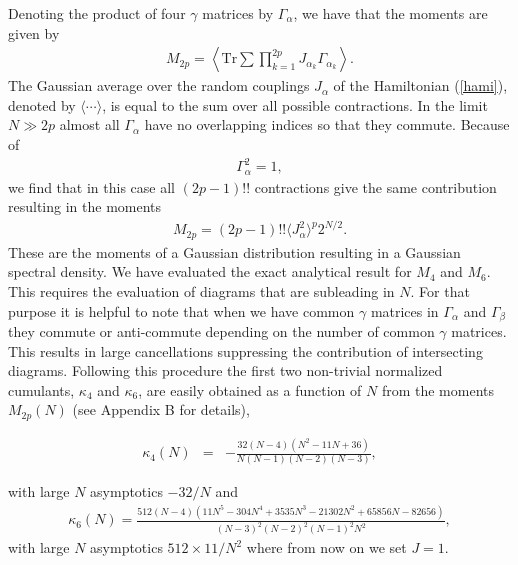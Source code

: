 \documentclass[aps,showpacs,floatfix,superscriptaddress,pre,11pt]{revtex4-1}
\newcommand{\Tr}{\rm Tr}
\newcommand{\be}{\begin{eqnarray}}
\newcommand{\ee}{\end{eqnarray}}
\def\Tr{\textrm{Tr}}
\begin{document}
 Denoting the product of four $\gamma$ matrices by $\Gamma_\alpha$, we have
 that
the moments are given by
 \be
 M_{2p} = \left \langle \Tr \sum \prod_{k=1}^{2p} J_{\alpha_k} \Gamma_{\alpha_k}
 \right \rangle.
\ee
 The Gaussian average over the random couplings $J_\alpha$ of the Hamiltonian (\ref{hami}), denoted by $\langle \cdots \rangle$,  is equal to the sum over all possible
contractions.
In the limit $N \gg 2p$ almost all  $\Gamma_\alpha$ have no
overlapping indices so that they commute. Because of
\be
\Gamma_\alpha^2 =1,
\label{gam2}
\ee
 we find that in this case all $(2p-1)!!$ contractions
give the same contribution resulting in the moments
\be
M_{2p} =(2p-1)!!\langle J_\alpha^2\rangle^p 2^{N/2}.
\label{semi-moments}
\ee
These are the moments of a Gaussian distribution resulting in a Gaussian spectral
   density. 
  We have evaluated the exact analytical result for $M_4$ and $M_6$. This requires the evaluation of diagrams that are subleading in $N$.
For that purpose it is helpful to note that when we have common $\gamma$ matrices in $\Gamma_\alpha$  and  $\Gamma_\beta$
   they commute or anti-commute depending on the number of common
   $\gamma$ matrices. This results in large cancellations suppressing the contribution 
   of intersecting diagrams. 
Following this procedure the first two non-trivial normalized cumulants, $\kappa_4$ and $\kappa_6$, are easily obtained as a function of $N$ from the moments $M_{2p}(N)$ (see Appendix B for details),

             \be \label{moment4}
          \kappa_4(N)&=&  -\frac{32(N-4)(N^2-11N+36)}{N(N-1)(N-2)(N-3)},
          \ee

with large $N$ asymptotics $-32/N$ and
     \be
     \kappa_6(N)= \frac
           {512 (N-4) (11 N^5-304 N^4+3535 N^3-21302 N^2+65856 N-82656)}{(N-3)^2 (N-2)^2 (N-1)^2 N^2},
          \label{moment6}
\ee
 with large $N$ asymptotics $512\times11/N^2$ where from now on we set $J=1$. 
 
\end{document}
